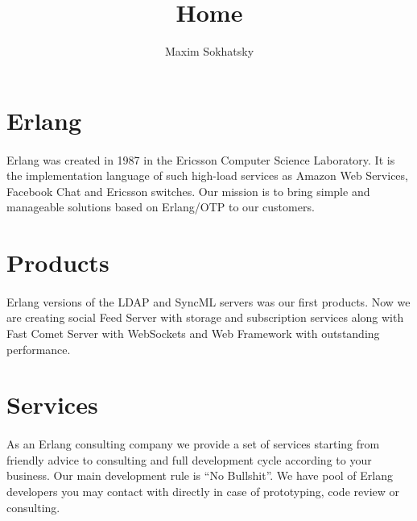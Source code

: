 \documentclass[11pt]{article}
\begin{document}
\title{Home}
\author{Maxim Sokhatsky}


\section*{Erlang}
\paragraph{}
Erlang was created in 1987 in the Ericsson Computer Science Laboratory.
It is the implementation language of such high-load services as Amazon Web Services,
Facebook Chat and Ericsson switches.
Our mission is to bring simple and manageable solutions based on Erlang/OTP to our customers.

\section*{Products}
\paragraph{}
Erlang versions of the LDAP and SyncML servers was our first products. Now we are
creating social Feed Server with storage and subscription services along with
Fast Comet Server with WebSockets and Web Framework with outstanding performance.

\section*{Services}
\paragraph{}
As an Erlang consulting company we provide a set of services starting from friendly advice to
consulting and full development cycle according to your business.
Our main development rule is ``No Bullshit''.
We have pool of Erlang developers you may contact with directly in case of
prototyping, code review or consulting.
\end{document}
